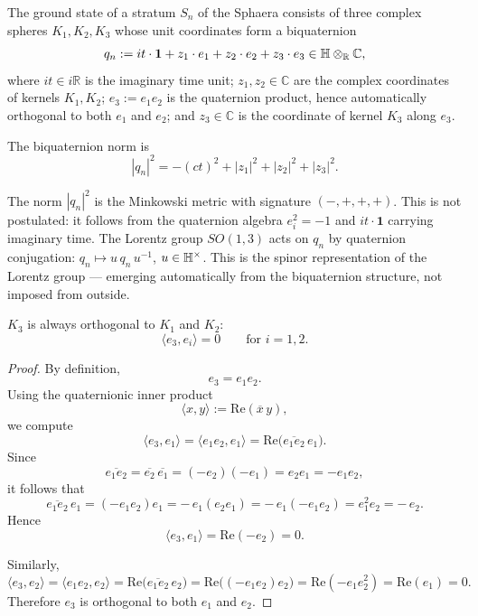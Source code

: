 \begin{definition}\label{def:biquaternion}
The ground state of a stratum $S_n$ of the Sphaera consists of three
complex spheres $K_1,K_2,K_3$ whose unit coordinates form a biquaternion
\[
  q_n := it\cdot\mathbf{1} + z_1\cdot e_1 + z_2\cdot e_2
         + z_3\cdot e_3 \in \mathbb{H}\otimes_{\mathbb{R}}\mathbb{C},
\]
where $it\in i\mathbb{R}$ is the imaginary time unit;
$z_1,z_2\in\mathbb{C}$ are the complex coordinates of kernels $K_1,K_2$;
$e_3:=e_1 e_2$ is the quaternion product, hence automatically orthogonal
to both $e_1$ and $e_2$;
and $z_3\in\mathbb{C}$ is the coordinate of kernel $K_3$ along $e_3$.

The biquaternion norm is
\[
  |q_n|^2 = -(ct)^2 + |z_1|^2 + |z_2|^2 + |z_3|^2.
\]
\end{definition}

\begin{remark}
The norm $|q_n|^2$ is the Minkowski metric with signature $(-,+,+,+)$.
This is not postulated: it follows from the quaternion algebra $e_i^2=-1$
and $it\cdot\mathbf{1}$ carrying imaginary time.
The Lorentz group $SO(1,3)$ acts on $q_n$ by quaternion conjugation:
$q_n\mapsto u\,q_n\,u^{-1}$, $u\in\mathbb{H}^\times$.
This is the spinor representation of the Lorentz group --- emerging
automatically from the biquaternion structure, not imposed from outside.
\end{remark}

\begin{proposition}
\label{prop:orthogonality-third-kernel}
$K_3$ is always orthogonal to $K_1$ and $K_2$:
\[
\langle e_3,e_i\rangle = 0 \qquad \text{for } i=1,2.
\]
\end{proposition}

\begin{proof}
By definition,
\[
e_3 = e_1 e_2.
\]
Using the quaternionic inner product
\[
\langle x,y\rangle := \mathrm{Re}(\overline{x}\,y),
\]
we compute
\[
\langle e_3,e_1\rangle
=
\langle e_1e_2,e_1\rangle
=
\mathrm{Re}\!\bigl(\overline{e_1e_2}\,e_1\bigr).
\]
Since
\[
\overline{e_1e_2}=\overline{e_2}\,\overline{e_1}=(-e_2)(-e_1)=e_2e_1=-e_1e_2,
\]
it follows that
\[
\overline{e_1e_2}\,e_1
=
(-e_1e_2)e_1
=
-\,e_1(e_2e_1)
=
-\,e_1(-e_1e_2)
=
e_1^2 e_2
=
-\,e_2.
\]
Hence
\[
\langle e_3,e_1\rangle
=
\mathrm{Re}(-e_2)=0.
\]

Similarly,
\[
\langle e_3,e_2\rangle
=
\langle e_1e_2,e_2\rangle
=
\mathrm{Re}\!\bigl(\overline{e_1e_2}\,e_2\bigr)
=
\mathrm{Re}\!\bigl((-e_1e_2)e_2\bigr)
=
\mathrm{Re}(-e_1 e_2^2)
=
\mathrm{Re}(e_1)=0.
\]
Therefore $e_3$ is orthogonal to both $e_1$ and $e_2$.
\end{proof}

